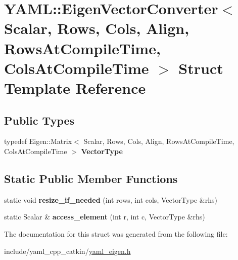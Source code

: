\hypertarget{structYAML_1_1EigenVectorConverter}{}\section{Y\+A\+ML\+:\+:Eigen\+Vector\+Converter$<$ Scalar, Rows, Cols, Align, Rows\+At\+Compile\+Time, Cols\+At\+Compile\+Time $>$ Struct Template Reference}
\label{structYAML_1_1EigenVectorConverter}
\subsection*{Public Types}
\begin{DoxyCompactItemize}
\item 
typedef Eigen\+::\+Matrix$<$ Scalar, Rows, Cols, Align, Rows\+At\+Compile\+Time, Cols\+At\+Compile\+Time $>$ {\bfseries Vector\+Type}\hypertarget{structYAML_1_1EigenVectorConverter_afa182cb98f58630ff1ed5548a961474e}{}\label{structYAML_1_1EigenVectorConverter_afa182cb98f58630ff1ed5548a961474e}

\end{DoxyCompactItemize}
\subsection*{Static Public Member Functions}
\begin{DoxyCompactItemize}
\item 
static void {\bfseries resize\+\_\+if\+\_\+needed} (int rows, int cols, Vector\+Type \&rhs)\hypertarget{structYAML_1_1EigenVectorConverter_a7a791e9412c2386c59b33794d7bd339a}{}\label{structYAML_1_1EigenVectorConverter_a7a791e9412c2386c59b33794d7bd339a}

\item 
static Scalar \& {\bfseries access\+\_\+element} (int r, int c, Vector\+Type \&rhs)\hypertarget{structYAML_1_1EigenVectorConverter_a6d52c444a505118006dc1e721da15fad}{}\label{structYAML_1_1EigenVectorConverter_a6d52c444a505118006dc1e721da15fad}

\end{DoxyCompactItemize}


The documentation for this struct was generated from the following file\+:\begin{DoxyCompactItemize}
\item 
include/yaml\+\_\+cpp\+\_\+catkin/\hyperlink{yaml__eigen_8h}{yaml\+\_\+eigen.\+h}\end{DoxyCompactItemize}

